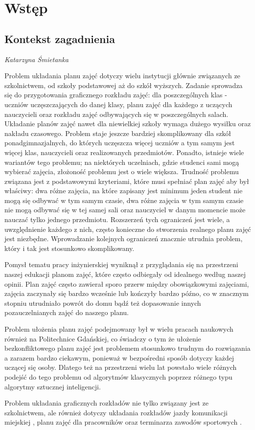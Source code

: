 
\chapter{Wstęp}

\section{Kontekst zagadnienia}
\textit{Katarzyna Śmietanka}
\par Problem układania planu zajęć dotyczy wielu instytucji głównie związanych ze szkolnictwem, od szkoły podstawowej aż do szkół wyższych. Zadanie sprowadza się do przygotowania graficznego rozkładu zajęć: dla poszczególnych klas - uczniów uczęszczających do danej klasy, planu zajęć dla każdego z uczących nauczycieli oraz rozkładu zajęć odbywających się w poszczególnych salach. Układanie planów zajęć nawet dla niewielkiej szkoły wymaga dużego wysiłku oraz nakładu czasowego. Problem staje jeszcze bardziej skomplikowany dla szkół ponadgimnazjalnych, do których uczęszcza więcej uczniów a tym samym jest więcej klas, nauczycieli oraz realizowanych przedmiotów. Ponadto, istnieje wiele wariantów tego problemu; na niektórych uczelniach, gdzie studenci sami mogą wybierać zajęcia, złożoność problemu jest o wiele większa. Trudność problemu związana jest z podstawowymi kryteriami, które musi spełniać plan zajęć aby był właściwy: dwa różne zajęcia, na które zapisany jest minimum jeden student nie mogą się odbywać w tym samym czasie, dwa różne zajęcia w tym samym czasie nie mogą odbywać się w tej samej sali oraz nauczyciel w danym momencie może nauczać tylko jednego przedmiotu. Rozszerzeń tych ograniczeń jest wiele, a uwzględnienie każdego z nich, często konieczne do stworzenia realnego planu zajęć jest niezbędne. Wprowadzanie kolejnych ograniczeń znacznie utrudnia problem, który i tak jest stosunkowo skomplikowany.
\par Pomysł tematu pracy inżynierskiej wyniknął z przyglądania się na przestrzeni naszej edukacji planom zajęć, które często odbiegały od idealnego według naszej opinii. Plan zajęć często zawierał sporo przerw między obowiązkowymi zajęciami, zajęcia zaczynały się bardzo wcześnie lub kończyły bardzo późno, co w znacznym stopniu utrudniało powrót do domu bądź też dopasowanie innych pozauczelnianych zajęć do naszego planu.
\par Problem ułożenia planu zajęć podejmowany był w wielu pracach naukowych również na Politechnice Gdańskiej, co świadczy o tym że ułożenie bezkonfliktowego planu zajęć jest problemem stosunkowo trudnym do rozwiązania a zarazem bardzo ciekawym, ponieważ w bezpośredni sposób dotyczy każdej uczącej się osoby. Dlatego też na przestrzeni wielu lat powstało wiele różnych podejść do tego problemu od algorytmów klasycznych poprzez różnego typu algorytmy sztucznej inteligencji.
\par Problem układania graficznych rozkładów nie tylko związany jest ze szkolnictwem, ale również dotyczy układania rozkładów jazdy komunikacji miejskiej \cite{com}, planu zajęć dla pracowników \cite{worker} oraz terminarza zawodów sportowych \cite{sport}.

